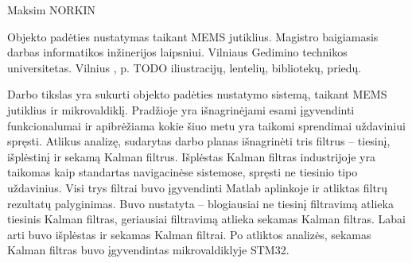 Maksim NORKIN

Objekto padėties nustatymas taikant MEMS jutiklius. 
Magistro baigiamasis darbas informatikos inžinerijos laipsniui. 
Vilniaus Gedimino technikos universitetas.
Vilnius \the\year, \pageref{LastPage} p. TODO iliustracijų, lentelių, bibliotekų, priedų.

Darbo tikslas yra sukurti objekto padėties nustatymo sistemą, taikant MEMS jutiklius ir mikrovaldiklį.
Pradžioje yra išnagrinėjami esami įgyvendinti funkcionalumai ir apibrėžiama kokie šiuo metu yra taikomi sprendimai uždaviniui spręsti.
Atlikus analizę, sudarytas darbo planas išnagrinėti tris filtrus -- tiesinį, išplėstinį ir sekamą Kalman filtrus.
Išplėstas Kalman filtras industrijoje yra taikomas kaip standartas navigacinėse sistemose, spręsti ne tiesinio tipo uždavinius.
Visi trys filtrai buvo įgyvendinti Matlab aplinkoje ir atliktas filtrų rezultatų palyginimas.
Buvo nustatyta -- blogiausiai ne tiesinį filtravimą atlieka tiesinis Kalman filtras, geriausiai filtravimą atlieka sekamas Kalman filtras.
Labai arti buvo išplėstas ir sekamas Kalman filtrai.
Po atliktos analizės, sekamas Kalman filtras buvo įgyvendintas mikrovaldiklyje STM32.